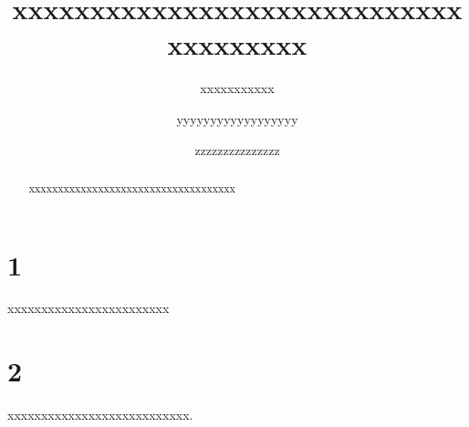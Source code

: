 \documentclass[a4paper,12pt,oneside,onecolumn,preprint]{elsarticle}
\begin{document}
\begin{frontmatter}

\title{xxxxxxxxxxxxxxxxxxxxxxxxxxxxxxxxxxxxxx}

\author[CQJTUS]{xxxxxxxxxxx}
\author[CQJTUT]{yyyyyyyyyyyyyyyyyy}
\author[CQJTUS]{zzzzzzzzzzzzzzz}


\address[CQJTUS]{xxxxxxxxxxxxxxxxxxxxxxxxxxxxxxxxxxxxxxxxx}
\address[CQJTUT]{xxxxxxxxxxxxxxxxxxxxxxxxxxxxxxxxxxxxxxxxx}

\begin{abstract}

xxxxxxxxxxxxxxxxxxxxxxxxxxxxxxxxxxxx

\end{abstract}

\begin{keyword}
\end{keyword}

\end{frontmatter}

\section{1}

xxxxxxxxxxxxxxxxxxxxxxxx

\section{2}

xxxxxxxxxxxxxxxxxxxxxxxxxxx.



\end{document}
